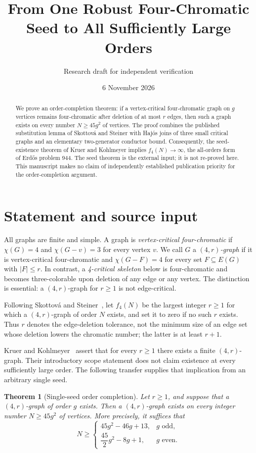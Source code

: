 \documentclass[11pt]{article}
\title{From One Robust Four-Chromatic Seed to All Sufficiently Large Orders}
\author{Research draft for independent verification}
\date{6 November 2026}
\newtheorem{theorem}{Theorem}
\begin{document}
\maketitle

\begin{abstract}
We prove an order-completion theorem: if a vertex-critical four-chromatic
graph on $g$ vertices remains four-chromatic after deletion of at most $r$
edges, then such a graph exists on every number $N\geq45g^2$ of vertices.
The proof combines the published substitution lemma of Skottov\'a and
Steiner with Haj\'os joins of three small critical graphs and an elementary
two-generator conductor bound. Consequently, the seed-existence theorem
of Kruer and Kohlmeyer implies $f_4(N)\to\infty$, the all-orders form of
Erd\H{o}s problem 944. The seed theorem is the external input; it is not
re-proved here. This manuscript makes no claim of independently established
publication priority for the order-completion argument.
\end{abstract}

\section{Statement and source input}

All graphs are finite and simple. A graph is \emph{vertex-critical
four-chromatic} if $\chi(G)=4$ and $\chi(G-v)=3$ for every vertex $v$.
We call $G$ a \emph{$(4,r)$-graph} if it is vertex-critical four-chromatic
and $\chi(G-F)=4$ for every set $F\subseteq E(G)$ with $|F|\leq r$.
In contrast, a \emph{4-critical skeleton} below is four-chromatic and
becomes three-colorable upon deletion of any edge or any vertex.
The distinction is essential: a $(4,r)$-graph for $r\geq1$ is not
edge-critical.

Following Skottov\'a and Steiner~\cite{SS}, let $f_4(N)$ be the largest
integer $r\geq1$ for which a $(4,r)$-graph of order $N$ exists, and set it
to zero if no such $r$ exists. Thus $r$ denotes the edge-deletion tolerance,
not the minimum size of an edge set whose deletion lowers the chromatic
number; the latter is at least $r+1$.

Kruer and Kohlmeyer~\cite[Theorem 1.1]{KK} assert that for every $r\geq1$
there exists a finite $(4,r)$-graph. Their introductory scope statement
does not claim existence at every sufficiently large order. The following
transfer supplies that implication from an arbitrary single seed.

\begin{theorem}[Single-seed order completion]\label{thm:main}
Let $r\geq1$, and suppose that a $(4,r)$-graph of order $g$ exists.
Then a $(4,r)$-graph exists on every integer number $N\geq45g^2$ of
vertices. More precisely, it suffices that
\[
N\geq
\begin{cases}
45g^2-46g+13,&g\text{ odd},\\
\dfrac{45}{2}g^2-8g+1,&g\text{ even}.
\end{cases}
\]
\end{theorem}
\end{document}
